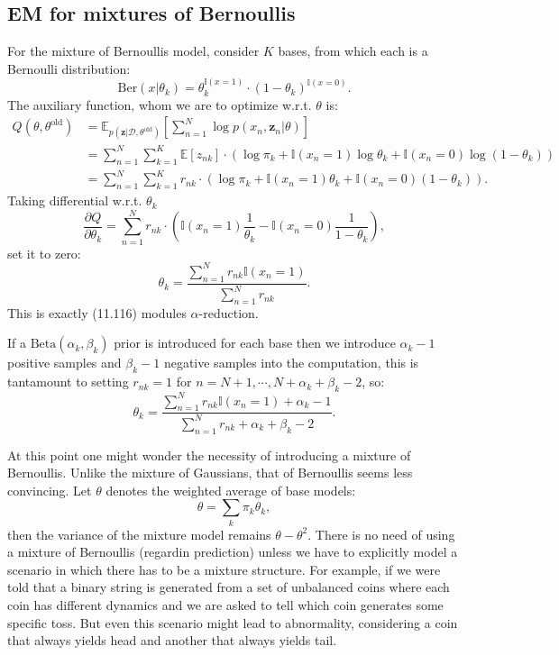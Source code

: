 \documentclass[UTF8]{ctexart}
\begin{document}
\subsection{EM for mixtures of Bernoullis}
For the mixture of Bernoullis model, consider $K$ bases, from which each is a Bernoulli distribution:
$$\text{Ber}(x|\theta_{k})=\theta_{k}^{\mathbb{I}(x=1)}\cdot (1-\theta_{k})^{\mathbb{I}(x=0)}.$$
The auxiliary function, whom we are to optimize w.r.t. $\theta$ is:
$$
\begin{aligned}
Q(\theta,\theta^{\text{old}})&=\mathbb{E}_{p(\textbf{z}|\mathcal{D},\theta^{\text{old}})}\left[\sum_{n=1}^{N}\log p(x_{n},\textbf{z}_{n}|\theta) \right]\\
&=\sum_{n=1}^{N}\sum_{k=1}^{K}\mathbb{E}[z_{nk}]\cdot\left(\log \pi_{k}+\mathbb{I}(x_{n}=1)\log\theta_{k}+\mathbb{I}(x_{n}=0)\log(1-\theta_{k}) \right)\\
&=\sum_{n=1}^{N}\sum_{k=1}^{K}r_{nk}\cdot(\log \pi_{k}+\mathbb{I}(x_{n}=1)\theta_{k}+\mathbb{I}(x_{n}=0)(1-\theta_{k})).
\end{aligned}
$$
Taking differential w.r.t. $\theta_{k}$
$$\frac{\partial Q}{\partial \theta_{k}}=\sum_{n=1}^{N}r_{nk}\cdot \left(\mathbb{I}(x_{n}=1)\frac{1}{\theta_{k}}-\mathbb{I}(x_{n}=0)\frac{1}{1-\theta_{k}}\right),$$
set it to zero:
$$\theta_{k}=\frac{\sum_{n=1}^{N}r_{nk}\mathbb{I}(x_{n}=1)}{\sum_{n=1}^{N}r_{nk}}.$$
This is exactly (11.116) modules $\alpha$-reduction.

If a $\text{Beta}(\alpha_{k},\beta_{k})$ prior is introduced for each base then we introduce $\alpha_{k}-1$ positive samples and $\beta_{k}-1$ negative samples into the computation, this is tantamount to setting $r_{nk}=1$ for $n=N+1,\cdots,N+\alpha_{k}+\beta_{k}-2$, so:
$$\theta_{k}=\frac{\sum_{n=1}^{N}r_{nk}\mathbb{I}(x_{n}=1)+\alpha_{k}-1}{\sum_{n=1}^{N}r_{nk}+\alpha_{k}+\beta_{k}-2}.$$

At this point one might wonder the necessity of introducing a mixture of Bernoullis.
Unlike the mixture of Gaussians, that of Bernoullis seems less convincing.
Let  $\theta$ denotes the weighted average of base models:
$$\theta=\sum_{k}\pi_{k}\theta_{k},$$
then the variance of the mixture model remains $\theta-\theta^{2}$.
There is no need of using a mixture of Bernoullis (regardin prediction) unless we have to explicitly model a scenario in which there has to be a mixture structure.
For example, if we were told that a binary string is generated from a set of unbalanced coins where each coin has different dynamics and we are asked to tell which coin generates some specific toss.
But even this scenario might lead to abnormality, considering a coin that always yields head and another that always yields tail.
\end{document}
